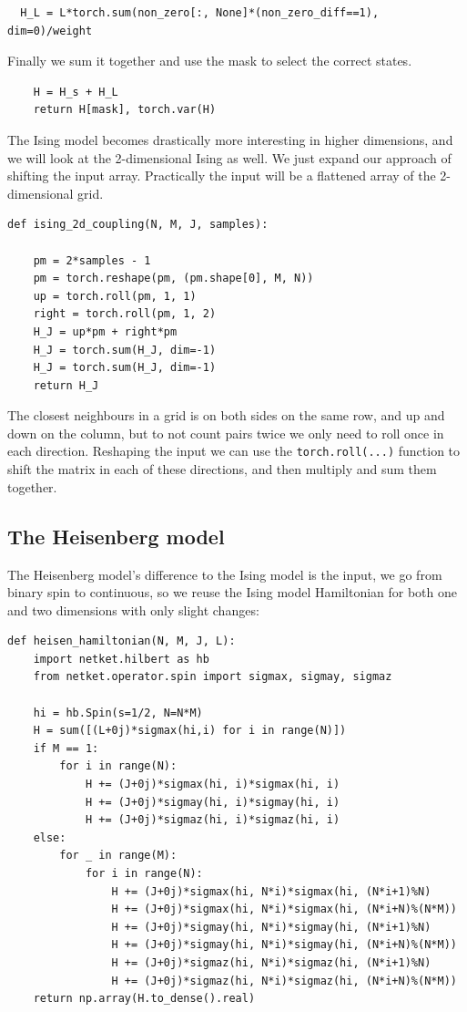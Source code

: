 \begin{verbatim}
  H_L = L*torch.sum(non_zero[:, None]*(non_zero_diff==1), dim=0)/weight
\end{verbatim}

Finally we sum it together and use the mask to select the correct states.

\begin{verbatim}
    H = H_s + H_L
    return H[mask], torch.var(H)
\end{verbatim}

The Ising model becomes drastically more interesting in higher dimensions, and we will look at the 2-dimensional Ising as well. We just expand our approach of shifting the input array. Practically the input will be a flattened array of the 2-dimensional grid.

\begin{verbatim}
def ising_2d_coupling(N, M, J, samples):
    
    pm = 2*samples - 1
    pm = torch.reshape(pm, (pm.shape[0], M, N))
    up = torch.roll(pm, 1, 1)
    right = torch.roll(pm, 1, 2)
    H_J = up*pm + right*pm
    H_J = torch.sum(H_J, dim=-1)
    H_J = torch.sum(H_J, dim=-1)
    return H_J
\end{verbatim}

The closest neighbours in a grid is on both sides on the same row, and up and down on the column, but to not count pairs twice we only need to roll once in each direction. Reshaping the input we can use the \texttt{torch.roll(...)} function to shift the matrix in each of these directions, and then multiply and sum them together.

\subsection{The Heisenberg model}

The Heisenberg model's difference to the Ising model is the input, we go from binary spin to continuous, so we reuse the Ising model Hamiltonian for both one and two dimensions with only slight changes:

\begin{verbatim}
def heisen_hamiltonian(N, M, J, L):
    import netket.hilbert as hb
    from netket.operator.spin import sigmax, sigmay, sigmaz

    hi = hb.Spin(s=1/2, N=N*M)
    H = sum([(L+0j)*sigmax(hi,i) for i in range(N)])
    if M == 1:
        for i in range(N):
            H += (J+0j)*sigmax(hi, i)*sigmax(hi, i)
            H += (J+0j)*sigmay(hi, i)*sigmay(hi, i)
            H += (J+0j)*sigmaz(hi, i)*sigmaz(hi, i)
    else:
        for _ in range(M):
            for i in range(N):
                H += (J+0j)*sigmax(hi, N*i)*sigmax(hi, (N*i+1)%N)
                H += (J+0j)*sigmax(hi, N*i)*sigmax(hi, (N*i+N)%(N*M))
                H += (J+0j)*sigmay(hi, N*i)*sigmay(hi, (N*i+1)%N)
                H += (J+0j)*sigmay(hi, N*i)*sigmay(hi, (N*i+N)%(N*M))
                H += (J+0j)*sigmaz(hi, N*i)*sigmaz(hi, (N*i+1)%N)
                H += (J+0j)*sigmaz(hi, N*i)*sigmaz(hi, (N*i+N)%(N*M))
    return np.array(H.to_dense().real)
\end{verbatim}

